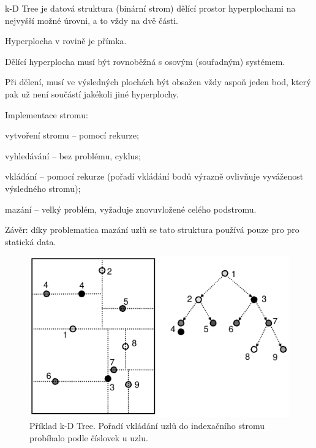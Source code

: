 \begin{compactitem}
    \item k-D Tree je datová struktura (binární strom) dělící prostor hyperplochami na nejvyšší možné úrovni, a to vždy na dvě části. \begin{compactitem}
        \item Hyperplocha v rovině je přímka.
        \item Dělící hyperplocha musí být rovnoběžná s osovým (souřadným) systémem.
        \item Při dělení, musí ve výsledných plochách být obsažen vždy aspoň jeden bod, který pak už není součástí jakékoli jiné hyperplochy.
    \end{compactitem}

    \item Implementace stromu: \begin{compactitem}
        \item vytvoření stromu -- pomocí rekurze;
        \item vyhledávání -- bez problému, cyklus;
        \item vkládání -- pomocí rekurze (pořadí vkládání bodů výrazně ovlivňuje vyváženost výsledného stromu);
        \item mazání -- velký problém, vyžaduje znovuvložené celého podstromu.
    \end{compactitem}

    \item Závěr: díky problematica mazání uzlů se tato struktura používá pouze pro pro statická data.
\end{compactitem}

\begin{figure}[H]
    \centering
    \includegraphics[width=0.75\linewidth]{kd_tree.pdf}
    \caption{Příklad k-D Tree. Pořadí vkládání uzlů do indexačního stromu probíhalo podle číslovek u uzlu.}
\end{figure}

